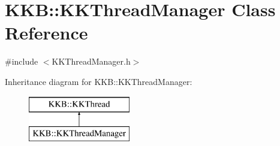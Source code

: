 \hypertarget{class_k_k_b_1_1_k_k_thread_manager}{}\section{K\+KB\+:\+:K\+K\+Thread\+Manager Class Reference}
\label{class_k_k_b_1_1_k_k_thread_manager}


{\ttfamily \#include $<$K\+K\+Thread\+Manager.\+h$>$}

Inheritance diagram for K\+KB\+:\+:K\+K\+Thread\+Manager\+:\begin{figure}[H]
\begin{center}
\leavevmode
\includegraphics[height=2.000000cm]{class_k_k_b_1_1_k_k_thread_manager}
\end{center}
\end{figure}
